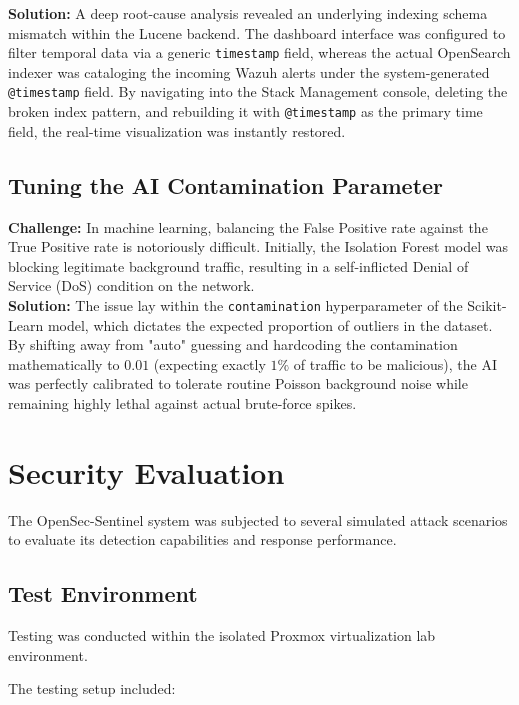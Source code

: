 \documentclass[12pt, a4paper]{report}
\begin{document}
	\textbf{Solution:} A deep root-cause analysis revealed an underlying indexing schema mismatch within the Lucene backend. The dashboard interface was configured to filter temporal data via a generic \texttt{timestamp} field, whereas the actual OpenSearch indexer was cataloging the incoming Wazuh alerts under the system-generated \texttt{@timestamp} field. By navigating into the Stack Management console, deleting the broken index pattern, and rebuilding it with \texttt{@timestamp} as the primary time field, the real-time visualization was instantly restored.
	
	\section{Tuning the AI Contamination Parameter}
	\textbf{Challenge:} In machine learning, balancing the False Positive rate against the True Positive rate is notoriously difficult. Initially, the Isolation Forest model was blocking legitimate background traffic, resulting in a self-inflicted Denial of Service (DoS) condition on the network.\\
	\textbf{Solution:} The issue lay within the \texttt{contamination} hyperparameter of the Scikit-Learn model, which dictates the expected proportion of outliers in the dataset. By shifting away from "auto" guessing and hardcoding the contamination mathematically to $0.01$ (expecting exactly $1\%$ of traffic to be malicious), the AI was perfectly calibrated to tolerate routine Poisson background noise while remaining highly lethal against actual brute-force spikes.

	\chapter{Security Evaluation}
	
	The OpenSec-Sentinel system was subjected to several simulated attack
	scenarios to evaluate its detection capabilities and response performance.
	
	\section{Test Environment}
	
	Testing was conducted within the isolated Proxmox virtualization lab
	environment.
	
	The testing setup included:
	
\end{document}
